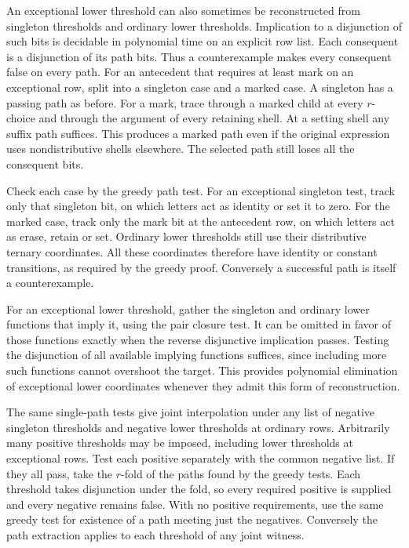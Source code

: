 An exceptional lower threshold can also sometimes be
reconstructed from singleton thresholds and ordinary
lower thresholds. Implication to a disjunction of
such bits is decidable in polynomial time on an
explicit row list. Each consequent is a disjunction
of its path bits. Thus a counterexample makes every
consequent false on every path. For an antecedent
that requires at least mark on an exceptional row,
split into a singleton case and a marked case.
A singleton has a passing path as before. For a
mark, trace through a marked child at every
$r$-choice and through the argument of every
retaining shell. At a setting shell any suffix
path suffices. This produces a marked path even
if the original expression uses nondistributive
shells elsewhere. The selected path still loses
all the consequent bits.

Check each case by the greedy path test. For an
exceptional singleton test, track only that
singleton bit, on which letters act as identity
or set it to zero. For the marked case, track only
the mark bit at the antecedent row, on which
letters act as erase, retain or set. Ordinary
lower thresholds still use their distributive
ternary coordinates. All these coordinates
therefore have identity or constant transitions,
as required by the greedy proof. Conversely a
successful path is itself a counterexample.

For an exceptional lower threshold, gather the
singleton and ordinary lower functions that
imply it, using the pair closure test. It can be
omitted in favor of those functions exactly when
the reverse disjunctive implication passes.
Testing the disjunction of all available implying
functions suffices, since including more such
functions cannot overshoot the target. This
provides polynomial elimination of exceptional
lower coordinates whenever they admit this
form of reconstruction.

The same single-path tests give joint interpolation
under any list of negative singleton thresholds and
negative lower thresholds at ordinary rows.
Arbitrarily many positive thresholds may be imposed,
including lower thresholds at exceptional rows.
Test each positive separately with the common
negative list. If they all pass, take the $r$-fold
of the paths found by the greedy tests. Each
threshold takes disjunction under the fold, so
every required positive is supplied and every
negative remains false. With no positive
requirements, use the same greedy test for existence
of a path meeting just the negatives. Conversely
the path extraction applies to each threshold of
any joint witness.

